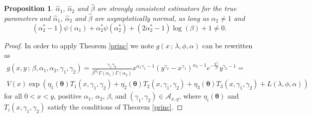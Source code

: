 \documentclass[12pt]{article} %
\newcommand{\bs}{\boldsymbol}
\newcommand{\on}{\operatorname}
\newtheorem{proposition}{Proposition}
\theoremstyle{definition}
\begin{document}
\begin{proposition}\label{proofgamma} $\hat\alpha_{1}$, $\hat\alpha_{2}$ and $\hat\beta$ are strongly consistent estimators for the true parameters and $\hat{\alpha}_1$, $\hat{\alpha}_2$ and $\hat{\beta}$ are asymptotically normal, as long as $\alpha_2\neq 1$ and
\begin{equation*}
(\alpha_2^*-1)\psi(\alpha_1) + \alpha_2^*\psi(\alpha_2^*) + (2\alpha_2^*-1)\log(\beta) + 1\neq 0.
\end{equation*}
\end{proposition}
\begin{proof}


In order to apply Theorem \ref{princ}
 we note $g(x\,;\,\lambda,\phi,\alpha)$ can be rewritten as
 \begin{equation*}
 \begin{aligned}
g(x,y\,;\,\beta,\alpha_1,\alpha_2,\gamma_1,\gamma_2) = \frac{\gamma_1\gamma_2}{\beta^{\alpha^*_2} \Gamma(\alpha_1)\Gamma(\alpha_2)} x^{\alpha_1\gamma_1-1} \left(y^{\gamma_2} - x^{\gamma_1}\right)^{\alpha_2-1} e^{-\frac{y^{\gamma_2}}{\beta}} y^{\gamma_2 - 1}
=\\ V(x)\exp\left(\eta_1(\bs{\theta})T_1(x,\gamma_1,\gamma_2)+\eta_2(\bs{\theta})T_2(x,\gamma_1,\gamma_2)+\eta_3(\bs{\theta})T_3(x,\gamma_1,\gamma_2)+L(\lambda,\phi,\alpha)\right)
 \end{aligned}
 \end{equation*}
for all $0<x<y$, positive $\alpha_1$, $\alpha_2$, $\beta$, and $(\gamma_1,\gamma_2)\in \mathcal{A}_{x,y}$, where $\eta_i(\bs{\theta})$ and $T_i(x,\gamma_1,\gamma_2)$ satisfy the conditions of Theorem \ref{princ}.


\end{proof}
\end{document}
